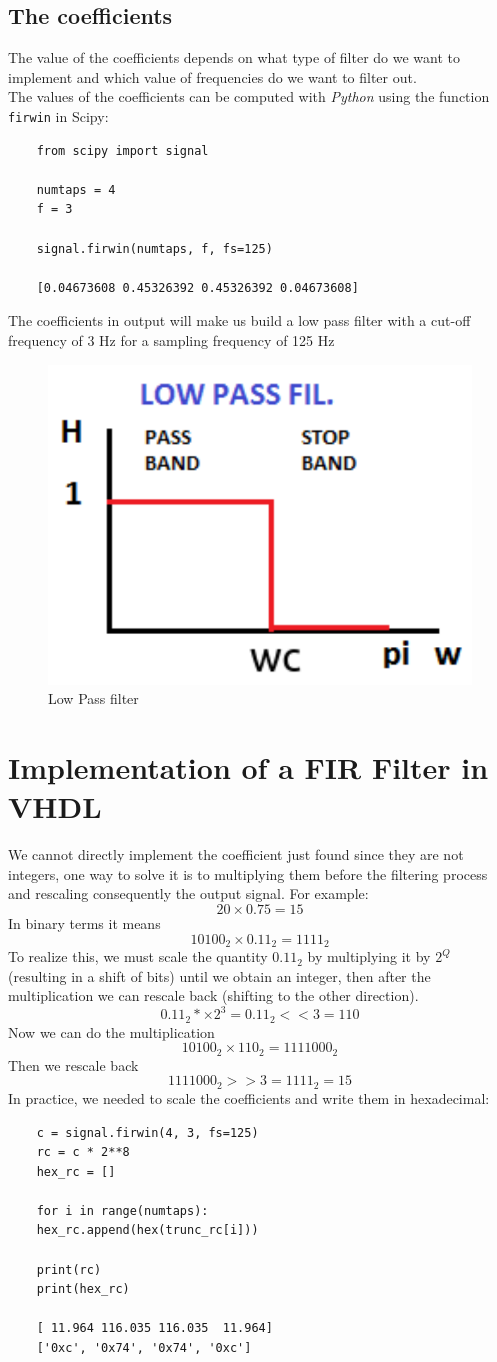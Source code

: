 \documentclass[11pt,a4paper,twocolumn]{IEEEtran}
\begin{document}
	\subsection*{The coefficients}
	The value of the coefficients depends on what type of filter do we want to implement and which value of frequencies do we want to filter out.\\
	The values of the coefficients can be computed with \emph{Python} using the function \texttt{firwin} in Scipy:
	\begin{lstlisting}
	from scipy import signal
	
	numtaps = 4
	f = 3
	
	signal.firwin(numtaps, f, fs=125)
	
	[0.04673608 0.45326392 0.45326392 0.04673608]
	\end{lstlisting}
	The coefficients in output will make us build a low pass filter with a cut-off frequency of 3 Hz for a sampling frequency of 125 Hz
	\begin{figure}[h]
		\centering
		\includegraphics[width=0.7\linewidth]{img/lowpass}
		\caption{Low Pass filter}
	\end{figure}
	\section{Implementation of a FIR Filter in VHDL}
	We cannot directly implement the coefficient just found since they are not integers, one way to solve it is to multiplying them before the filtering process and rescaling consequently the output signal. For example:\\$$20\times 0.75 = 15$$ In binary terms it means
	$$ 10100_2 \times 0.11_2 = 1111_2$$
	To realize this, we must scale the quantity $0.11_2$ by multiplying it by $2^Q$ (resulting in a shift of bits) until we obtain an integer, then after the multiplication we can rescale back (shifting to the other direction).
	$$0.11_2 *\times 2^3 = 0.11_2 <<3 = 110$$
	Now we can do the multiplication
	$$10100_2\times 110_2 = 1111000_2$$
	Then we rescale back
	$$1111000_2 >> 3 = 1111_2 = 15$$
	In practice, we needed to scale the coefficients and write them in hexadecimal:
	\begin{lstlisting}
	c = signal.firwin(4, 3, fs=125)
	rc = c * 2**8
	hex_rc = []
	
	for i in range(numtaps):
	hex_rc.append(hex(trunc_rc[i]))
	
	print(rc)    
	print(hex_rc)
	
	[ 11.964 116.035 116.035  11.964]
	['0xc', '0x74', '0x74', '0xc']
	\end{lstlisting}
\end{document}
